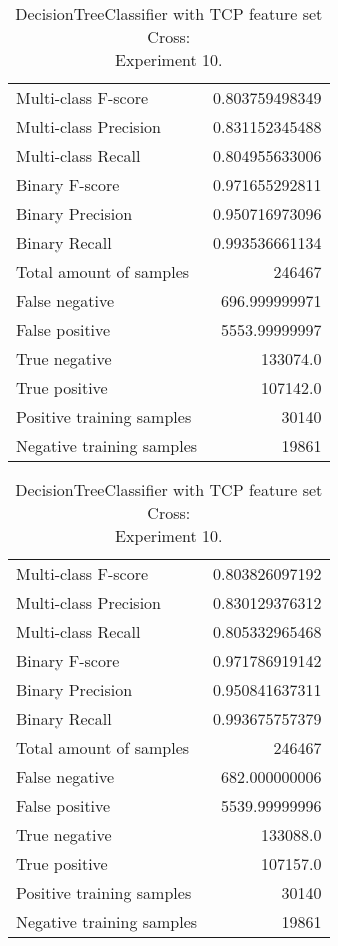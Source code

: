 \begin{table}[H]
\begin{minipage}{0.5\textwidth}
\caption{DecisionTreeClassifier with TCP feature set Cross: \\Experiment 9.}
\centering
\begin{tabular}{l r}
\toprule
Multi-class F-score & 0.803759498349 \\
Multi-class Precision & 0.831152345488 \\
Multi-class Recall & 0.804955633006 \\
\midrule
Binary F-score & 0.971655292811 \\
Binary Precision & 0.950716973096 \\
Binary Recall & 0.993536661134 \\
\midrule
Total amount of samples & 246467 \\
False negative & 696.999999971 \\
False positive & 5553.99999997 \\
True negative & 133074.0 \\
True positive & 107142.0 \\
\midrule
Positive training samples & 30140 \\
Negative training samples & 19861 \\
\bottomrule
\end{tabular}
\end{minipage}
\hfillx
\begin{minipage}{0.5\textwidth}
\caption{DecisionTreeClassifier with TCP feature set Cross: \\Experiment 10.}
\centering
\begin{tabular}{l r}
\toprule
Multi-class F-score & 0.803826097192 \\
Multi-class Precision & 0.830129376312 \\
Multi-class Recall & 0.805332965468 \\
\midrule
Binary F-score & 0.971786919142 \\
Binary Precision & 0.950841637311 \\
Binary Recall & 0.993675757379 \\
\midrule
Total amount of samples & 246467 \\
False negative & 682.000000006 \\
False positive & 5539.99999996 \\
True negative & 133088.0 \\
True positive & 107157.0 \\
\midrule
Positive training samples & 30140 \\
Negative training samples & 19861 \\
\bottomrule
\end{tabular}
\end{minipage}
\end{table}
